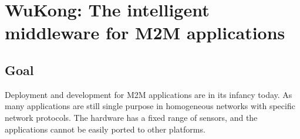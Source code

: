 \section{WuKong: The intelligent middleware for M2M applications}

\subsection{Goal}

Deployment and development for M2M applications are in its infancy today. As
many applications are still single purpose in homogeneous networks with
specific network protocols. The hardware has a fixed range of sensors, and the
applications cannot be easily ported to other platforms.

